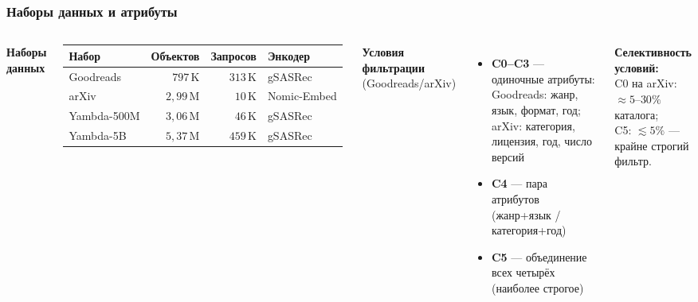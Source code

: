 \documentclass[aspectratio=169,9pt]{beamer}
\begin{document}
\begin{frame}
\frametitle{Наборы данных и атрибуты}

\begin{columns}[T]
  \textbf{Наборы данных}
  \vspace{0.2em}

  {\footnotesize
  \begin{tabular}{lrrl}
    \toprule
    Набор & Объектов & Запросов & Энкодер \\
    \midrule
    Goodreads   & $797$\,K   & $313$\,K & gSASRec \\
    arXiv       & $2{,}99$\,M & $10$\,K  & Nomic-Embed \\
    Yambda-500M & $3{,}06$\,M & $46$\,K  & gSASRec \\
    Yambda-5B   & $5{,}37$\,M & $459$\,K & gSASRec \\
    \bottomrule
  \end{tabular}}

  \textbf{Условия фильтрации} (Goodreads/arXiv)
  \begin{itemize}\footnotesize
    \item \textbf{C0--C3} --- одиночные атрибуты:\\
          Goodreads: жанр, язык, формат, год;\\
          arXiv: категория, лицензия, год, число версий
    \item \textbf{C4} --- пара атрибутов (жанр+язык / категория+год)
    \item \textbf{C5} --- объединение всех четырёх (наиболее строгое)
  \end{itemize}

  \vspace{0.4em}
  \textbf{Селективность условий:}\\
  C0 на arXiv: $\approx 5$--$30\%$ каталога;\\
  C5: $\lesssim 5\%$ --- крайне строгий фильтр.
\end{columns}
\end{frame}
\end{document}
